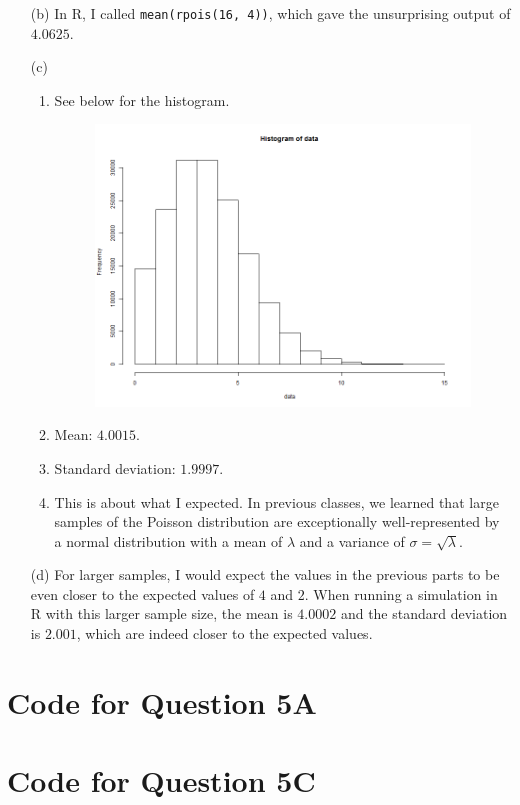 \documentclass{article}
\begin{document}
\begin{enumerate}
\begin{enumerate}
\begin{figure}[h]
        \end{figure}
    \item [(b)] In R, I called \texttt{mean(rpois(16, 4))}, which gave the unsurprising output of $4.0625$.
    \item [(c)]
        \begin{enumerate}
        \item See below for the histogram.
        \begin{figure}[h]
        \centering
            \includegraphics[width=\textwidth]{sta248-a1-q5-c}
        \end{figure}
        \item Mean: $4.0015$.
        \item Standard deviation: $1.9997$.
        \item This is about what I expected. In previous classes, we learned that large samples of the Poisson distribution are exceptionally well-represented by a normal distribution with a mean of $\lambda$ and a variance of $\sigma = \sqrt{\lambda}$.
        \end{enumerate}
    \item [(d)] For larger samples, I would expect the values in the previous parts to be even closer to the expected values of $4$ and $2$. When running a simulation in R with this larger sample size, the mean is $4.0002$ and the standard deviation is $2.001$, which are indeed closer to the expected values.
    \end{enumerate}
\end{enumerate}

\newpage
\appendix
\section{Code for Question 5A}

\section{Code for Question 5C}

\end{document}
